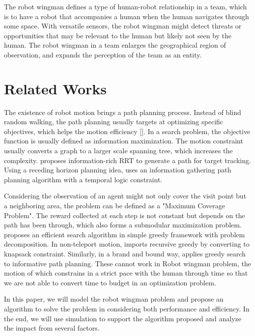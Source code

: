 \documentclass[12pt]{article}
\begin{document}
The robot wingman defines a type of human-robot relationship in a team, which is to have a robot that accompanies a human when the human navigates through
some space. With versatile sensors, the robot wingman might detect threats or opportunities that may be relevant to the human but likely not seen by the human. The robot wingman in a team enlarges the geographical region of observation, and expands the perception of the team as an entity.

\section{Related Works}

The existence of robot motion brings a path planning process. Instead of blind random walking, the path planning usually targets at optimizing specific objectives, which helps the motion efficiency [\cite{goodrich2013toward}]. In a search problem, the objective function is usually defined as information maximization. The motion constraint usually converts a graph to a larger scale spanning tree, which increases the complexity. \cite{levine2010information} proposes information-rich RRT to generate a path for target tracking. Using a receding horizon planning idea, \cite{JonesSchwagerBeltaICRA13scLTLInfo} uses an information gathering path planning algorithm with a temporal logic constraint.

Considering the observation of an agent might not only cover the visit point but a neighboring area, the problem can be defined as a "Maximum Coverage Problem". The reward collected at each step is not constant but depends on the path has been through, which also forms a submodular maximization problem. \cite{singh2009efficient} proposes an efficient search algorithm in simple greedy framework with problem decomposition. In non-teleport motion, \cite{chekuri2005recursive} imports recursive greedy by converting to knapsack constraint. Similarly, in a brand and bound way, \cite{binney2012branch} applies greedy search to informative path planning. These cannot work in Robot wingman problem, the motion of which constrains in a strict pace with the human through time so that we are not able to convert time to budget in an optimization problem.

In this paper, we will model the robot wingman problem and propose an algorithm to solve the problem in considering both performance and efficiency. In the end, we will use simulation to support the algorithm proposed and analyze the impact from several factors. 
\end{document}
